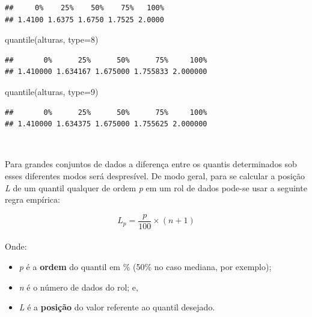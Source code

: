 \documentclass[
]{book}
\newenvironment{Shaded}{\begin{snugshade}}{\end{snugshade}}
\newcommand{\AttributeTok}[1]{\textcolor[rgb]{0.77,0.63,0.00}{#1}}
\newcommand{\DecValTok}[1]{\textcolor[rgb]{0.00,0.00,0.81}{#1}}
\newcommand{\FunctionTok}[1]{\textcolor[rgb]{0.00,0.00,0.00}{#1}}
\newcommand{\NormalTok}[1]{#1}
\providecommand{\tightlist}{%
  \setlength{\itemsep}{0pt}\setlength{\parskip}{0pt}}
\begin{document}
\begin{verbatim}
##     0%    25%    50%    75%   100% 
## 1.4100 1.6375 1.6750 1.7525 2.0000
\end{verbatim}

\begin{Shaded}
\begin{Highlighting}[]
\FunctionTok{quantile}\NormalTok{(alturas, }\AttributeTok{type=}\DecValTok{8}\NormalTok{)}
\end{Highlighting}
\end{Shaded}

\begin{verbatim}
##       0%      25%      50%      75%     100% 
## 1.410000 1.634167 1.675000 1.755833 2.000000
\end{verbatim}

\begin{Shaded}
\begin{Highlighting}[]
\FunctionTok{quantile}\NormalTok{(alturas, }\AttributeTok{type=}\DecValTok{9}\NormalTok{)}
\end{Highlighting}
\end{Shaded}

\begin{verbatim}
##       0%      25%      50%      75%     100% 
## 1.410000 1.634375 1.675000 1.755625 2.000000
\end{verbatim}

~

Para grandes conjuntos de dados a diferença entre os quantis determinados sob esses diferentes modos será despresível. De modo geral, para se calcular a posição \emph{L} de um quantil qualquer de ordem \emph{p} em um rol de dados pode-se usar a seguinte regra empírica:

\[
L_{p}=\frac{p}{100} \times (n+1)
\]\\

Onde:

\hfill\break

\begin{itemize}
\tightlist
\item
  \emph{p} é a \textbf{ordem} do quantil em \% (50\% no caso mediana, por exemplo);
\item
  \emph{n} é o número de dados do rol; e,
\item
  \emph{L} é a \textbf{posição} do valor referente ao quantil desejado.
\end{itemize}

\hfill\break

\hfill\break
\end{document}
